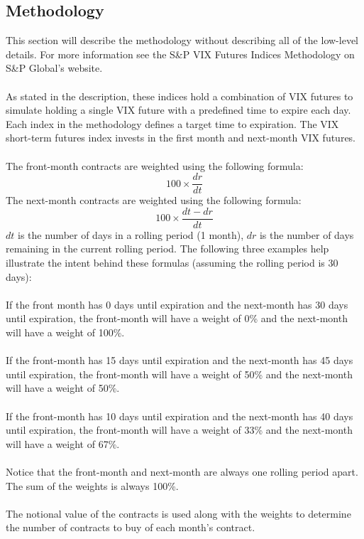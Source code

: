 \documentclass[11pt, oneside]{book}
\begin{document}
\subsection{Methodology} \label{ETFs-Index-Methodology}
This section will describe the methodology without describing all of the low-level details. For more information see the S\&P VIX Futures Indices Methodology on S\&P Global's website.\\
\\
As stated in the description, these indices hold a combination of VIX futures to simulate holding a single VIX future with a predefined time to expire each day. Each index in the methodology defines a target time to expiration. The VIX short-term futures index invests in the first month and next-month VIX futures.\\
\\
The front-month contracts are weighted using the following formula:
\begin{equation}
100 \times \frac{dr}{dt}
\end{equation} \label{Eq-FrontMonthWeight}
The next-month contracts are weighted using the following formula:
\begin{equation}
100 \times \frac{dt-dr}{dt}
\end{equation} \label{Eq-NextMonthWeight}
$dt$ is the number of days in a rolling period (1 month), $dr$ is the number of days remaining in the current rolling period. The following three examples help illustrate the intent behind these formulas (assuming the rolling period is 30 days):\\
\\
If the front month has 0 days until expiration and the next-month has 30 days until expiration, the front-month will have a weight of 0\% and the next-month will have a weight of 100\%.\\
\\
If the front-month has 15 days until expiration and the next-month has 45 days until expiration, the front-month will have a weight of 50\% and the next-month will have a weight of 50\%.\\
\\
If the front-month has 10 days until expiration and the next-month has 40 days until expiration, the front-month will have a weight of 33\% and the next-month will have a weight of 67\%.\\
\\
Notice that the front-month and next-month are always one rolling period apart. The sum of the weights is always 100\%.\\
\\
The notional value of the contracts is used along with the weights to determine the number of contracts to buy of each month's contract.
\end{document}
